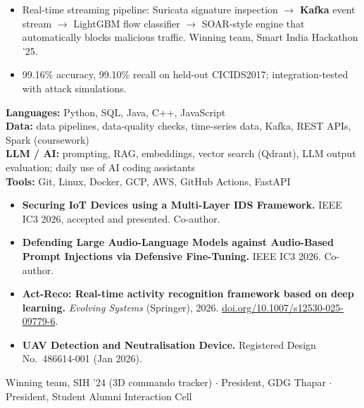 \begin{itemize}
  \item Real-time streaming pipeline: Suricata signature inspection $\rightarrow$ \textbf{Kafka} event stream $\rightarrow$ LightGBM flow classifier $\rightarrow$ SOAR-style engine that automatically blocks malicious traffic. Winning team, Smart India Hackathon '25.
  \item 99.16\% accuracy, 99.10\% recall on held-out CICIDS2017; integration-tested with attack simulations.
\end{itemize}

\textbf{Languages:} Python, SQL, Java, C++, JavaScript\\
\textbf{Data:} data pipelines, data-quality checks, time-series data, Kafka, REST APIs, Spark (coursework)\\
\textbf{LLM / AI:} prompting, RAG, embeddings, vector search (Qdrant), LLM output evaluation; daily use of AI coding assistants\\
\textbf{Tools:} Git, Linux, Docker, GCP, AWS, GitHub Actions, FastAPI

\begin{itemize}
  \item \textbf{Securing IoT Devices using a Multi-Layer IDS Framework.} IEEE IC3 2026, accepted and presented. Co-author.
  \item \textbf{Defending Large Audio-Language Models against Audio-Based Prompt Injections via Defensive Fine-Tuning.} IEEE IC3 2026. Co-author.
  \item \textbf{Act-Reco: Real-time activity recognition framework based on deep learning.} \textit{Evolving Systems} (Springer), 2026. \href{https://doi.org/10.1007/s12530-025-09779-6}{doi.org/10.1007/s12530-025-09779-6}.
  \item \textbf{UAV Detection and Neutralisation Device.} Registered Design No.\ 486614-001 (Jan 2026).
\end{itemize}

Winning team, SIH '24 (3D commando tracker) $\cdot$ President, GDG Thapar $\cdot$ President, Student Alumni Interaction Cell

